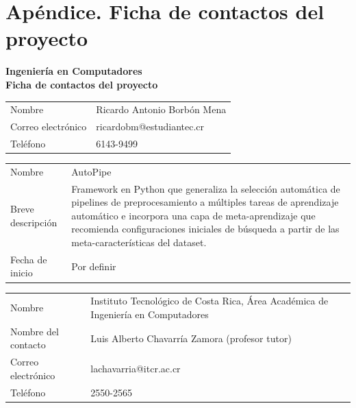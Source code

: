 \documentclass[12pt,letterpaper]{article}
\begin{document}
\newpage
\appendix
\section*{Apéndice. Ficha de contactos del proyecto}

\vspace{0.5em}
\begin{center}
{\large\bfseries Ingeniería en Computadores}\\
{\bfseries Ficha de contactos del proyecto}
\end{center}

\vspace{1em}

\begin{tabularx}{\textwidth}{L{5cm} Y}
\toprule
{}  \\
\midrule
Nombre & Ricardo Antonio Borbón Mena \\
Correo electrónico & ricardobm@estudiantec.cr \\
Teléfono & 6143-9499 \\
\bottomrule
\end{tabularx}

\vspace{1em}

\begin{tabularx}{\textwidth}{L{5cm} Y}
\toprule
{}  \\
\midrule
Nombre & AutoPipe \\
Breve descripción & Framework en Python que generaliza la selección automática de pipelines de preprocesamiento a múltiples tareas de aprendizaje automático e incorpora una capa de meta-aprendizaje que recomienda configuraciones iniciales de búsqueda a partir de las meta-características del dataset. \\
Fecha de inicio & Por definir \\
\bottomrule
\end{tabularx}

\vspace{1em}

\begin{tabularx}{\textwidth}{L{5cm} Y}
\toprule
{}  \\
\midrule
Nombre & Instituto Tecnológico de Costa Rica, Área Académica de Ingeniería en Computadores \\
Nombre del contacto & Luis Alberto Chavarría Zamora (profesor tutor) \\
Correo electrónico & lachavarria@itcr.ac.cr \\
Teléfono & 2550-2565 \\
\bottomrule
\end{tabularx}
\end{document}
